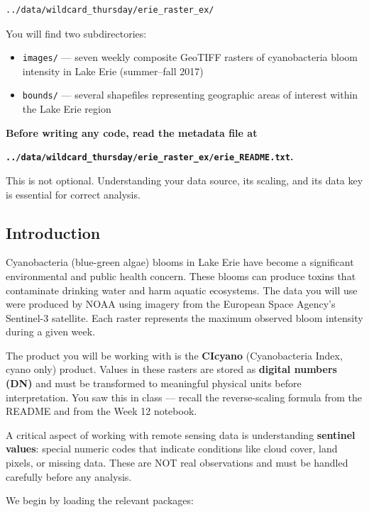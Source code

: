 \documentclass[
]{article}
\providecommand{\tightlist}{%
  \setlength{\itemsep}{0pt}\setlength{\parskip}{0pt}}
\begin{document}
\begin{verbatim}
../data/wildcard_thursday/erie_raster_ex/
\end{verbatim}

You will find two subdirectories:

\begin{itemize}
\tightlist
\item
  \texttt{images/} --- seven weekly composite GeoTIFF rasters of
  cyanobacteria bloom intensity in Lake Erie (summer--fall 2017)
\item
  \texttt{bounds/} --- several shapefiles representing geographic areas
  of interest within the Lake Erie region
\end{itemize}

\textbf{Before writing any code, read the metadata file at}

\textbf{\texttt{../data/wildcard\_thursday/erie\_raster\_ex/erie\_README.txt}.}

This is not optional. Understanding your data source, its scaling, and
its data key is essential for correct analysis.

\hypertarget{introduction}{%
\subsection{Introduction}\label{introduction}}

Cyanobacteria (blue-green algae) blooms in Lake Erie have become a
significant environmental and public health concern. These blooms can
produce toxins that contaminate drinking water and harm aquatic
ecosystems. The data you will use were produced by NOAA using imagery
from the European Space Agency's Sentinel-3 satellite. Each raster
represents the maximum observed bloom intensity during a given week.

The product you will be working with is the \textbf{CIcyano}
(Cyanobacteria Index, cyano only) product. Values in these rasters are
stored as \textbf{digital numbers (DN)} and must be transformed to
meaningful physical units before interpretation. You saw this in class
--- recall the reverse-scaling formula from the README and from the Week
12 notebook.

A critical aspect of working with remote sensing data is understanding
\textbf{sentinel values}: special numeric codes that indicate conditions
like cloud cover, land pixels, or missing data. These are NOT real
observations and must be handled carefully before any analysis.

We begin by loading the relevant packages:
\end{document}
